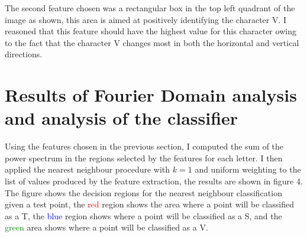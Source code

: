 \documentclass[a4paper,12px,twocolumn]{article}
\begin{document}
\begin{flushleft}
{    \smallskip

    The second feature chosen was a rectangular box in the top left quadrant of the image as shown, this area is aimed at positively identifying
    the character V. I reasoned that this feature should have the highest value for this character owing to the fact that the character
    V changes most in both the horizontal and vertical directions.


}

\section{Results of Fourier Domain analysis and analysis of the classifier}

    Using the features chosen in the previous section, I computed the sum of the power spectrum in the regions selected
    by the features for each letter. I then applied the nearest neighbour procedure with $k=1$ and uniform weighting to the list of
    values produced by the feature extraction, the results are shown in figure 4. The figure shows the decision regions for the
    nearest neighbour classification given a test point, the \textcolor{red}{red} region shows the area where a point will be classified as a T,
    the \textcolor{blue}{blue} region shows where a point will be classified as a S, and the \textcolor{green}{green} area shows where a point will be classified
    as a V.




\end{flushleft}
\end{document}
